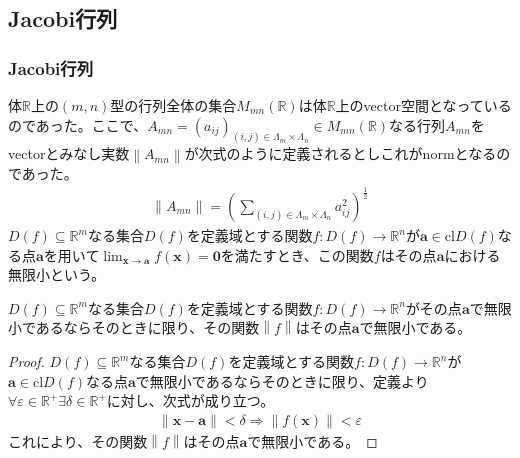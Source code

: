 \documentclass[dvipdfmx]{jsarticle}
\begin{document}
\subsection{Jacobi行列}%
\subsubsection{Jacobi行列}%
\begin{dfn}
体$\mathbb{R}$上の$(m,n)$型の行列全体の集合$M_{mn}\left( \mathbb{R} \right)$は体$\mathbb{R}$上のvector空間となっているのであった。ここで、$A_{mn} = \left( a_{ij} \right)_{(i,j) \in \varLambda_{m} \times \varLambda_{n}} \in M_{mn}\left( \mathbb{R} \right)$なる行列$A_{mn}$をvectorとみなし実数$\left\| A_{mn} \right\|$が次式のように定義されるとしこれがnormとなるのであった。
\begin{align*}
\left\| A_{mn} \right\| = \left( \sum_{(i,j) \in \varLambda_{m} \times \varLambda_{n}} a_{ij}^{2} \right)^{\frac{1}{2}}
\end{align*}
$D(f) \subseteq \mathbb{R}^{m}$なる集合$D(f)$を定義域とする関数$f:D(f) \rightarrow \mathbb{R}^{n}$が$\mathbf{a} \in \mathrm{cl}{D(f)}$なる点$\mathbf{a}$を用いて$\lim_{\mathbf{x} \rightarrow \mathbf{a}}{f\left( \mathbf{x} \right)} = \mathbf{0}$を満たすとき、この関数$f$はその点$\mathbf{a}$における無限小という。
\end{dfn}
\begin{thm}\label{4.2.6.1}
$D(f) \subseteq \mathbb{R}^{m}$なる集合$D(f)$を定義域とする関数$f:D(f) \rightarrow \mathbb{R}^{n}$がその点$\mathbf{a}$で無限小であるならそのときに限り、その関数$\left\| f \right\|$はその点$\mathbf{a}$で無限小である。
\end{thm}
\begin{proof}
$D(f) \subseteq \mathbb{R}^{m}$なる集合$D(f)$を定義域とする関数$f:D(f) \rightarrow \mathbb{R}^{n}$が$\mathbf{a} \in \mathrm{cl}{D(f)}$なる点$\mathbf{a}$で無限小であるならそのときに限り、定義より$\forall\varepsilon \in \mathbb{R}^{+}\exists\delta \in \mathbb{R}^{+}$に対し、次式が成り立つ。
\begin{align*}
\left\| \mathbf{x} - \mathbf{a} \right\| < \delta \Rightarrow \left\| f\left( \mathbf{x} \right) \right\| < \varepsilon
\end{align*}
これにより、その関数$\left\| f \right\|$はその点$\mathbf{a}$で無限小である。
\end{proof}
\end{document}
